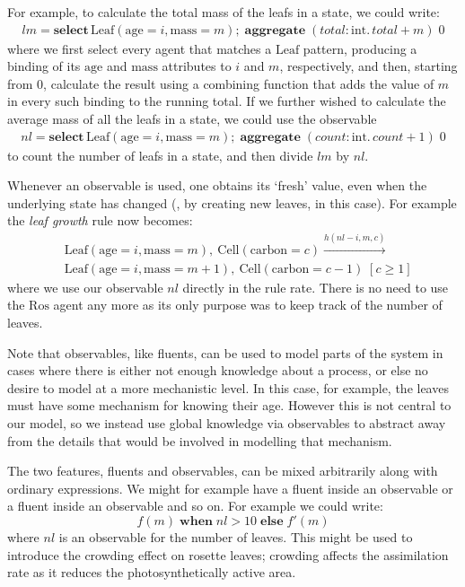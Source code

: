 For example, to calculate the total mass  of the leafs in a state, we could write:
 \begin{align*}
lm = \mathbf{select} \, \mathrm{Leaf}(\mathrm{age} = i, \mathrm{mass} = m) \mathbf{;} \; \mathbf{aggregate} \;
 (total: \mathrm{int}.\, total + m) \; 0
\end{align*}
%
where we first select every agent that matches a $\mathrm{Leaf}$ pattern,
producing a binding of its $\mathrm{age}$ and $\mathrm{mass}$ attributes to $i$
and $m$, respectively, and then, starting from $0$, calculate the result using a
combining function that adds the value of $m$ in every such binding to the
running total.
If we further wished to calculate the average mass of all the leafs in a state,
we could use the observable
\begin{align*}
nl = \mathbf{select} \, \mathrm{Leaf}(\mathrm{age} = i, \mathrm{mass} = m) \mathbf{;} \; \mathbf{aggregate} \;
 (count: \mathrm{int}.\, count + 1) \; 0
\end{align*}
%
to count the number of leafs in a state, and then divide $lm$ by $nl$.

Whenever an observable is used, one obtains its `fresh' value, even when the
underlying state has changed (\eg, by creating new leaves, in this case). For
example the \textit{leaf growth} rule now becomes:
%
\begin{align*}
&\mathrm{Leaf}(\mathrm{age} \!= \!i, \mathrm{mass} \!= \!m),\:
  \mathrm{Cell}(\mathrm{carbon} \!= \!c) \xrightarrow{h(nl-i, m, c)}\:   \\
  &
 \mathrm{Leaf}(\mathrm{age} \!= \!i, \mathrm{mass} \!= \!m+1),\:
    \mathrm{Cell}(\mathrm{carbon} \!= \!c-1) \; [c \geq  1]
\end{align*}
where we use our observable $nl$ directly in the rule rate. There is no need to
use the $\mathrm{Ros}$ agent any more as its only purpose was to keep track of
the number of leaves.

Note that observables, like fluents, can be used to model parts of the system in
cases where there is either not enough knowledge about a process, or else no
desire to model at a more mechanistic level. In this case, for example, the
leaves must have some mechanism for knowing their age. However this is not
central to our model, so we instead use global knowledge via observables to
abstract away from the details that would be involved in modelling that
mechanism.

The two features, fluents and observables, can be mixed arbitrarily along with
ordinary expressions. We might for example have a fluent inside an observable or
a fluent inside an observable and so on. For example we could write:
\begin{equation*}
f(m) \; \mathbf{when} \; nl > 10 \; \mathbf{else} \; f'(m)
\end{equation*}
where $nl$ is an observable for the number of leaves. This might be used to
introduce the crowding effect on rosette leaves; crowding affects the
assimilation rate as it reduces the photosynthetically active area.

